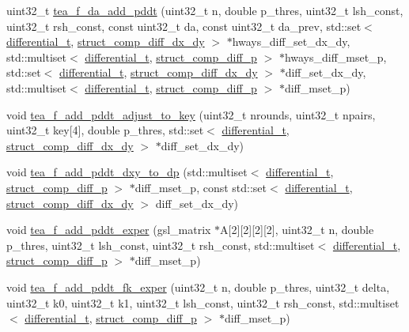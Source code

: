 \begin{DoxyCompactItemize}
\item 
uint32\-\_\-t \hyperlink{tea-f-add-pddt_8hh_a379d6e4054b1bf78e6068f4cbdd06065}{tea\-\_\-f\-\_\-da\-\_\-add\-\_\-pddt} (uint32\-\_\-t n, double p\-\_\-thres, uint32\-\_\-t lsh\-\_\-const, uint32\-\_\-t rsh\-\_\-const, const uint32\-\_\-t da, const uint32\-\_\-t da\-\_\-prev, std\-::set$<$ \hyperlink{structdifferential__t}{differential\-\_\-t}, \hyperlink{structstruct__comp__diff__dx__dy}{struct\-\_\-comp\-\_\-diff\-\_\-dx\-\_\-dy} $>$ $\ast$hways\-\_\-diff\-\_\-set\-\_\-dx\-\_\-dy, std\-::multiset$<$ \hyperlink{structdifferential__t}{differential\-\_\-t}, \hyperlink{structstruct__comp__diff__p}{struct\-\_\-comp\-\_\-diff\-\_\-p} $>$ $\ast$hways\-\_\-diff\-\_\-mset\-\_\-p, std\-::set$<$ \hyperlink{structdifferential__t}{differential\-\_\-t}, \hyperlink{structstruct__comp__diff__dx__dy}{struct\-\_\-comp\-\_\-diff\-\_\-dx\-\_\-dy} $>$ $\ast$diff\-\_\-set\-\_\-dx\-\_\-dy, std\-::multiset$<$ \hyperlink{structdifferential__t}{differential\-\_\-t}, \hyperlink{structstruct__comp__diff__p}{struct\-\_\-comp\-\_\-diff\-\_\-p} $>$ $\ast$diff\-\_\-mset\-\_\-p)
\item 
void \hyperlink{tea-f-add-pddt_8hh_aa60ac75c659872644ff116ea451bed41}{tea\-\_\-f\-\_\-add\-\_\-pddt\-\_\-adjust\-\_\-to\-\_\-key} (uint32\-\_\-t nrounds, uint32\-\_\-t npairs, uint32\-\_\-t key\mbox{[}4\mbox{]}, double p\-\_\-thres, std\-::set$<$ \hyperlink{structdifferential__t}{differential\-\_\-t}, \hyperlink{structstruct__comp__diff__dx__dy}{struct\-\_\-comp\-\_\-diff\-\_\-dx\-\_\-dy} $>$ $\ast$diff\-\_\-set\-\_\-dx\-\_\-dy)
\item 
void \hyperlink{tea-f-add-pddt_8hh_a6334dfbee70edb6980086f15da98f826}{tea\-\_\-f\-\_\-add\-\_\-pddt\-\_\-dxy\-\_\-to\-\_\-dp} (std\-::multiset$<$ \hyperlink{structdifferential__t}{differential\-\_\-t}, \hyperlink{structstruct__comp__diff__p}{struct\-\_\-comp\-\_\-diff\-\_\-p} $>$ $\ast$diff\-\_\-mset\-\_\-p, const std\-::set$<$ \hyperlink{structdifferential__t}{differential\-\_\-t}, \hyperlink{structstruct__comp__diff__dx__dy}{struct\-\_\-comp\-\_\-diff\-\_\-dx\-\_\-dy} $>$ diff\-\_\-set\-\_\-dx\-\_\-dy)
\item 
void \hyperlink{tea-f-add-pddt_8hh_ad6e23f144fd280b089361de9cad58121}{tea\-\_\-f\-\_\-add\-\_\-pddt\-\_\-exper} (gsl\-\_\-matrix $\ast$\-A\mbox{[}2\mbox{]}\mbox{[}2\mbox{]}\mbox{[}2\mbox{]}\mbox{[}2\mbox{]}, uint32\-\_\-t n, double p\-\_\-thres, uint32\-\_\-t lsh\-\_\-const, uint32\-\_\-t rsh\-\_\-const, std\-::multiset$<$ \hyperlink{structdifferential__t}{differential\-\_\-t}, \hyperlink{structstruct__comp__diff__p}{struct\-\_\-comp\-\_\-diff\-\_\-p} $>$ $\ast$diff\-\_\-mset\-\_\-p)
\item 
void \hyperlink{tea-f-add-pddt_8hh_a630bf3eeaef1d61366bfc0ab790f6ab7}{tea\-\_\-f\-\_\-add\-\_\-pddt\-\_\-fk\-\_\-exper} (uint32\-\_\-t n, double p\-\_\-thres, uint32\-\_\-t delta, uint32\-\_\-t k0, uint32\-\_\-t k1, uint32\-\_\-t lsh\-\_\-const, uint32\-\_\-t rsh\-\_\-const, std\-::multiset$<$ \hyperlink{structdifferential__t}{differential\-\_\-t}, \hyperlink{structstruct__comp__diff__p}{struct\-\_\-comp\-\_\-diff\-\_\-p} $>$ $\ast$diff\-\_\-mset\-\_\-p)
\end{DoxyCompactItemize}


